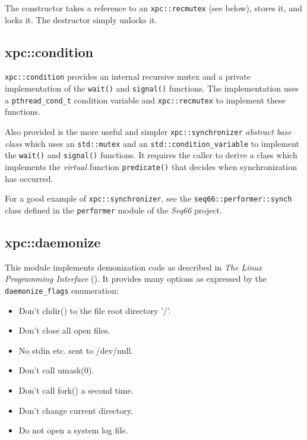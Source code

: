    The constructor takes a reference to an \texttt{xpc::recmutex}
   (see below), stores it, and locks it.
   The destructor simply unlocks it.

\subsection{xpc::condition}
\label{subsec:xpc_namespace_condition}

   \texttt{xpc::condition} provides an internal recursive mutex and a
   private implementation of the \texttt{wait()} and
   \texttt{signal()} functions.
   The implementation uses a
   \texttt{pthread\_cond\_t} condition variable and
   \texttt{xpc::recmutex} to implement these functions.

   Also provided is the more useful and simpler
   \texttt{xpc::synchronizer} \textsl{abstract base class} which uses
   an \texttt{std::mutex} and
   an \texttt{std::condition\_variable}
   to implement the \texttt{wait()} and \texttt{signal()} functions.
   It requires the caller to derive a class which implements the
   \textsl{virtual} function \texttt{predicate()} that decides
   when synchronization has occurred.

   For a good example of \texttt{xpc::synchronizer}, see
   the \texttt{seq66::performer::synch} class defined
   in the \texttt{performer} module of the \textsl{Seq66} project.

\subsection{xpc::daemonize}
\label{subsec:xpc_namespace_daemonize}

   This module implements demonization code as described in
   \textsl{The Linux Programming Interface} (\cite{lpi}).
   It provides many options as expressed by the \texttt{daemonize\_flags}
   enumeration:

   \begin{itemize}
      \item Don't chdir() to the file root directory '/'.
      \item Don't close all open files.
      \item No stdin etc. sent to /dev/null.
      \item Don't call umask(0).
      \item Don't call fork() a second time.
      \item Don't change current directory.
      \item Do not open a system log file.
   \end{itemize}

